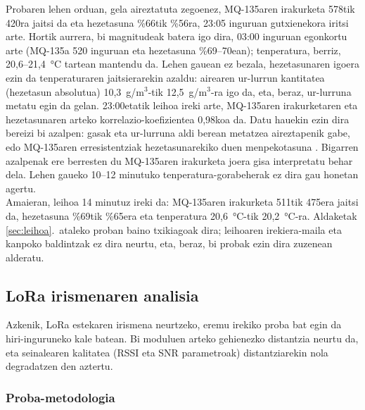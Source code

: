\documentclass[10pt]{article}
\begin{document}
Probaren lehen orduan, gela aireztatuta zegoenez, MQ-135aren irakurketa 578tik 420ra jaitsi da eta hezetasuna \%66tik \%56ra, 23:05 inguruan gutxienekora iritsi arte. Hortik aurrera, bi magnitudeak batera igo dira, 03:00 inguruan egonkortu arte (MQ-135a 520 inguruan eta hezetasuna \%69--70ean); tenperatura, berriz, 20,6--21,4~°C tartean mantendu da. Lehen gauean ez bezala, hezetasunaren igoera ezin da tenperaturaren jaitsierarekin azaldu: airearen ur-lurrun kantitatea (hezetasun absolutua) 10,3~g/m$^3$-tik 12,5~g/m$^3$-ra igo da, eta, beraz, ur-lurruna metatu egin da gelan. 23:00etatik leihoa ireki arte, MQ-135aren irakurketaren eta hezetasunaren arteko korrelazio-koefizientea 0,98koa da. Datu hauekin ezin dira bereizi bi azalpen: gasak eta ur-lurruna aldi berean metatzea aireztapenik gabe, edo MQ-135aren erresistentziak hezetasunarekiko duen menpekotasuna \cite{mq135_sensor}. Bigarren azalpenak ere berresten du MQ-135aren irakurketa joera gisa interpretatu behar dela. Lehen gaueko 10--12 minutuko tenperatura-gorabeherak ez dira gau honetan agertu.\\

Amaieran, leihoa 14 minutuz ireki da: MQ-135aren irakurketa 511tik 475era jaitsi da, hezetasuna \%69tik \%65era eta tenperatura 20,6~°C-tik 20,2~°C-ra. Aldaketak \ref{sec:leihoa}.~ataleko proban baino txikiagoak dira; leihoaren irekiera-maila eta kanpoko baldintzak ez dira neurtu, eta, beraz, bi probak ezin dira zuzenean alderatu.\\

\subsection{\acs{LoRa} irismenaren analisia}
\label{sec:irismena}

Azkenik, \ac{LoRa} estekaren irismena neurtzeko, eremu irekiko proba bat egin da hiri-inguruneko kale batean. Bi moduluen arteko gehienezko distantzia neurtu da, eta seinalearen kalitatea (\ac{RSSI} eta \ac{SNR} parametroak) distantziarekin nola degradatzen den aztertu.\\

\subsubsection{Proba-metodologia}
\end{document}
